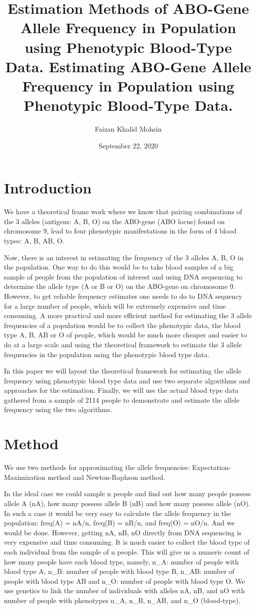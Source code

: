 \documentclass[]{article}
\title{Estimation Methods of ABO-Gene Allele Frequency in Population using
Phenotypic Blood-Type Data. Estimating ABO-Gene Allele Frequency in
Population using Phenotypic Blood-Type Data.}
\author{Faizan Khalid Mohsin}
\date{September 22, 2020}
\begin{document}
\maketitle

\section{Introduction}\label{introduction}

We have a theoretical frame work where we know that pairing combinations
of the 3 alleles (antigens: A, B, O) on the ABO-gene (ABO locus) found
on chromosome 9, lead to four phenotypic manifestations in the form of 4
blood types: A, B, AB, O.

Now, there is an interest in estimating the frequency of the 3 alleles
A, B, O in the population. One way to do this would be to take blood
samples of a big sample of people from the population of interest and
using DNA sequencing to determine the allele type (A or B or O) on the
ABO-gene on chromosome 9. However, to get reliable frequency estimates
one needs to do to DNA sequency for a large number of people, which will
be extremely expensive and time consuming. A more practical and more
efficient method for estimating the 3 allele frequencies of a population
would be to collect the phenotypic data, the blood type A, B, AB or O of
people, which would be much more cheaper and easier to do at a large
scale and using the theoretical framework to estimate the 3 allele
frequencies in the population using the phenotypic blood type data.

In this paper we will layout the theoretical framework for estimating
the allele frequency using phenotypic blood type data and use two
separate algorithms and approaches for the estimation. Finally, we will
use the actual blood type data gathered from a sample of 2114 people to
demonstrate and estimate the allele frequency using the two algorithms.

\section{Method}\label{method}

We use two methods for approximating the allele frequencies:
Expectation-Maximization method and Newton-Raphson method.

In the ideal case we could sample n people and find out how many people
possess allele A (nA), how many possess allele B (nB) and how many
possess allele (nO). In such a case it would be very easy to calculate
the allele frequency in the population: freq(A) = nA/n, freq(B) = nB/n,
and freq(O) = nO/n. And we would be done. However, getting nA, nB, nO
directly from DNA sequencing is very expensive and time consuming. It is
much easier to collect the blood type of each individual from the sample
of n people. This will give us a numeric count of how many people have
each blood type, namely, n\_A: number of people with blood type A, n\_B:
number of people with blood type B, n\_AB: number of people with blood
type AB and n\_O: number of people with blood type O. We use genetics to
link the number of individuals with alleles nA, nB, and nO with number
of people with phenotypes n\_A, n\_B, n\_AB, and n\_O (blood-type).
\end{document}
